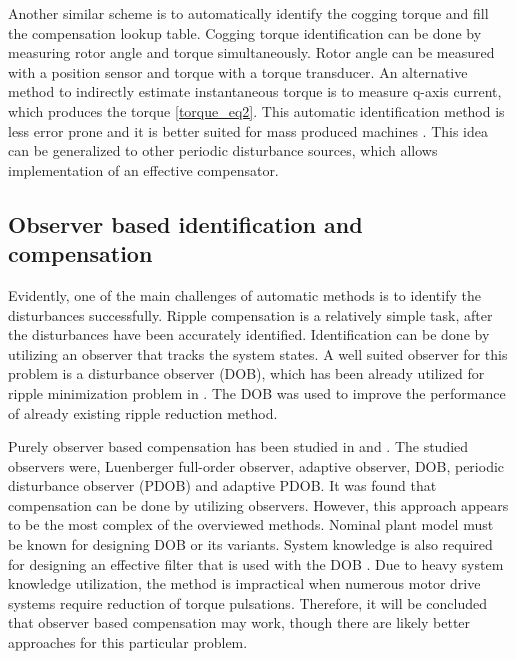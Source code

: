 Another similar scheme is to automatically identify the cogging torque and fill the compensation lookup table. Cogging torque identification can be done by measuring rotor angle and torque simultaneously. Rotor angle can be measured with a position sensor and torque with a torque transducer. An alternative method to indirectly estimate instantaneous torque is to measure q-axis current, which produces the torque \eqref{torque_eq2}. This automatic identification method is less error prone and it is better suited for mass produced machines \cite{CTR_SW_ff:2011, CTR_SW:2014, CTR_SW:2019}. This idea can be generalized to other periodic disturbance sources, which allows implementation of an effective compensator.

\subsection{Observer based identification and compensation}
Evidently, one of the main challenges of automatic methods is to identify the disturbances successfully. Ripple compensation is a relatively simple task, after the disturbances have been accurately identified. Identification can be done by utilizing an observer that tracks the system states. A well suited observer for this problem is a disturbance observer (DOB), which has been already utilized for ripple minimization problem in \cite{TRR_SW:2019}. The DOB was used to improve the performance of already existing ripple reduction method.

Purely observer based compensation has been studied in \cite{Observer:2013} and \cite{Observer:2018}. The studied observers were, Luenberger full-order observer, adaptive observer, DOB, periodic disturbance observer (PDOB) and adaptive PDOB. It was found that compensation can be done by utilizing observers. However, this approach appears to be the most complex of the overviewed methods. Nominal plant model must be known for designing DOB or its variants. System knowledge is also required for designing an effective filter that is used with the DOB \cite{Observer:2018}. Due to heavy system knowledge utilization, the method is impractical when numerous motor drive systems require reduction of torque pulsations. Therefore, it will be concluded that observer based compensation may work, though there are likely better approaches for this particular problem.

